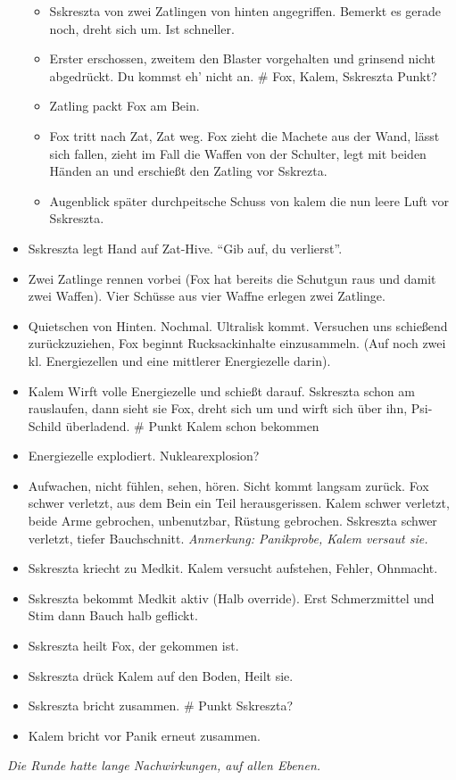 \documentclass[11pt]{scrartcl}
\begin{document}
\begin{itemize}
  \begin{itemize}
  \item
    Sskreszta von zwei Zatlingen von hinten angegriffen. Bemerkt es
    gerade noch, dreht sich um. Ist schneller.
  \item
    Erster erschossen, zweitem den Blaster vorgehalten und grinsend
    nicht abgedrückt. Du kommst eh' nicht an. \# Fox, Kalem, Sskreszta
    Punkt?
  \item
    Zatling packt Fox am Bein.
  \item
    Fox tritt nach Zat, Zat weg. Fox zieht die Machete aus der Wand,
    lässt sich fallen, zieht im Fall die Waffen von der Schulter, legt
    mit beiden Händen an und erschießt den Zatling vor Sskrezta.
  \item
    Augenblick später durchpeitsche Schuss von kalem die nun leere Luft
    vor Sskreszta.
  \end{itemize}
\item
  Sskreszta legt Hand auf Zat-Hive. ``Gib auf, du verlierst''.
\item
  Zwei Zatlinge rennen vorbei (Fox hat bereits die Schutgun raus und
  damit zwei Waffen). Vier Schüsse aus vier Waffne erlegen zwei
  Zatlinge.
\item
  Quietschen von Hinten. Nochmal. Ultralisk kommt. Versuchen uns
  schießend zurückzuziehen, Fox beginnt Rucksackinhalte einzusammeln.
  (Auf noch zwei kl. Energiezellen und eine mittlerer Energiezelle
  darin).
\item
  Kalem Wirft volle Energiezelle und schießt darauf. Sskreszta schon am
  rauslaufen, dann sieht sie Fox, dreht sich um und wirft sich über ihn,
  Psi-Schild überladend. \# Punkt Kalem schon bekommen
\item
  Energiezelle explodiert. Nuklearexplosion?
\item
  Aufwachen, nicht fühlen, sehen, hören. Sicht kommt langsam zurück. Fox
  schwer verletzt, aus dem Bein ein Teil herausgerissen. Kalem schwer
  verletzt, beide Arme gebrochen, unbenutzbar, Rüstung gebrochen.
  Sskreszta schwer verletzt, tiefer Bauchschnitt. \emph{Anmerkung:
  Panikprobe, Kalem versaut sie.}
\item
  Sskreszta kriecht zu Medkit. Kalem versucht aufstehen, Fehler,
  Ohnmacht.
\item
  Sskreszta bekommt Medkit aktiv (Halb override). Erst Schmerzmittel und
  Stim dann Bauch halb geflickt.
\item
  Sskreszta heilt Fox, der gekommen ist.
\item
  Sskreszta drück Kalem auf den Boden, Heilt sie.
\item
  Sskreszta bricht zusammen. \# Punkt Sskreszta?
\item
  Kalem bricht vor Panik erneut zusammen.
\end{itemize}
\emph{Die Runde hatte lange Nachwirkungen, auf allen Ebenen.}
\end{document}
